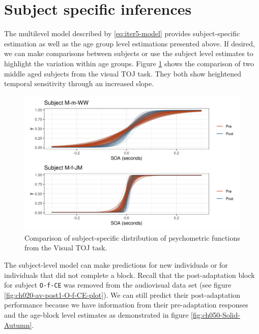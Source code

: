 \documentclass[11pt, oneside, openany]{scrbook}
\begin{document}
\hypertarget{subject-specific-inferences}{%
\section{Subject specific inferences}\label{subject-specific-inferences}}

The multilevel model described by \eqref{eq:iter5-model} provides subject-specific estimation as well as the age group level estimations presented above. If desired, we can make comparisons between subjects or use the subject level estimates to highlight the variation within age groups. Figure \ref{fig:ch050-Green-Metaphor} shows the comparison of two middle aged subjects from the visual TOJ task. They both show heightened temporal sensitivity through an increased slope.

\begin{figure}

{\centering \includegraphics[width=0.85\linewidth]{figures/ch050-Green-Metaphor} 

}

\caption{Comparison of subject-specific distribution of psychometric functions from the Visual TOJ task.}\label{fig:ch050-Green-Metaphor}
\end{figure}

The subject-level model can make predictions for new individuals or for individuals that did not complete a block. Recall that the post-adaptation block for subject \texttt{O-f-CE} was removed from the audiovisual data set (see figure \ref{fig:ch020-av-post1-O-f-CE-plot}). We can still predict their post-adaptation performance because we have information from their pre-adaptation responses and the age-block level estimates as demonstrated in figure \ref{fig:ch050-Solid-Autumn}.
\end{document}
